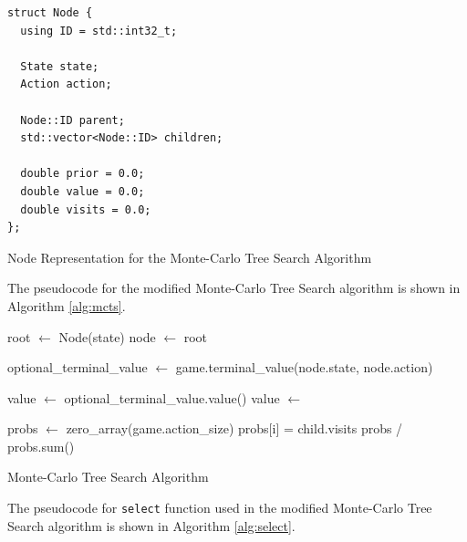 \begin{listing}[htb]
\begin{verbatim}
struct Node {
  using ID = std::int32_t;

  State state;
  Action action;

  Node::ID parent;
  std::vector<Node::ID> children;

  double prior = 0.0;
  double value = 0.0;
  double visits = 0.0;
};
\end{verbatim}
\caption{Node Representation for the Monte-Carlo Tree Search Algorithm}
\label{lst:mcts_node}
\end{listing}

The pseudocode for the modified Monte-Carlo Tree Search algorithm is shown in Algorithm \ref{alg:mcts}.

\begin{algorithm}[htb]
    \begin{algorithmic}[1]
            \State root $\gets$ Node(state)
                \State node $\gets$ root
        
        
                \State optional\_terminal\_value $\gets$ game.terminal\_value(node.state, node.action)
                
                    \State value $\gets$ optional\_terminal\_value.value()
                \Else
                    \State value $\gets$ 
                \EndIf
        
                \State {}
            \EndFor

            \State probs $\gets$ zero\_array(game.action\_size)
                \State probs[i] = child.visits
            \EndFor
            \State \Return probs / probs.sum()
        \EndFunction
    \end{algorithmic}
    \caption{Monte-Carlo Tree Search Algorithm}
    \label{alg:mcts}
\end{algorithm}

\clearpage

The pseudocode for \verb|select| function used in the modified Monte-Carlo Tree Search algorithm is shown in Algorithm \ref{alg:select}.

